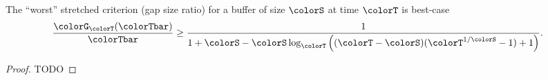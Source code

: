 \begin{lemma}
\label{thm:stretched-ideal-strict}
The ``worst'' stretched criterion (gap size ratio) for a buffer of size $\colorS$ at time $\colorT$ is best-case
\begin{align*}
\frac{\colorG_{\colorT}(\colorTbar)}{\colorTbar}
&\geq
\frac{
  1
}{
  1 + \colorS
  - \colorS \log_{\colorT}\Big(
    (\colorT - \colorS)(\colorT^{1/\colorS} - 1) + 1
  \Big)
}.
  \end{align*}
\end{lemma}

\begin{proof}
TODO
\end{proof}